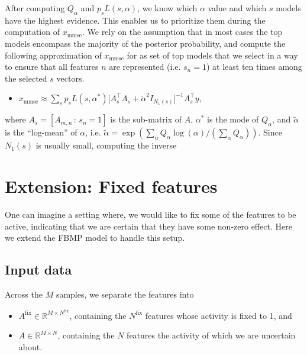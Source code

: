 \documentclass[letter,10pt,oneside]{article}
\newcommand{\no}{\noindent}
\newcommand{\+}{^\dagger}
\newcommand{\s}{^\ast}
\newcommand{\T}{^\top}
\begin{document}
After computing $Q_\alpha$ and $p_s L(s,\alpha)$, we know which $\alpha$ value and which $s$ models have the highest evidence. This enables us to prioritize them during the computation of $x_\text{mmse}$. We rely on the assumption that in most cases the top models encompass the majority of the posterior probability, and compute the following approximation of $x_\text{mmse}$ for as set of top models that we select in a way to ensure that all features $n$ are represented (i.e. $s_n=1$) at least ten times among the selected $s$ vectors.
\begin{itemize}
  \item $x_\text{mmse} \approx \sum_s p_s L(s, \alpha\s) \big[A_s\T A_s + \tilde{\alpha}^2 I_{N_1(s)}\big]^{-1}A_s\T y$,
\end{itemize}
where $A_s = [A_{m,n}\,:\,s_n=1]$ is the sub-matrix of $A$, $\alpha\s$ is the mode of $Q_\alpha$, and $\tilde \alpha$ is the ``log-mean'' of $\alpha$, i.e. $\tilde{\alpha} = \exp(\sum_\alpha Q_\alpha \log(\alpha) / (\sum_\alpha Q_\alpha))$. Since $N_1(s)$ is usually small, computing the inverse 


\section{Extension: Fixed features}
One can imagine a setting where, we would like to fix some of the features to be active, indicating that we are certain that they have some non-zero effect. Here we extend the FBMP model to handle this setup.

\subsection{Input data}
\no Across the $M$ samples, we separate the features into
\begin{itemize}
  \item $A^\text{fix} \in \mathds{R}^{M\times N^\text{fix}}$, containing the $N^\text{fix}$ features whose activity is fixed to 1, and
  \item $A\in \mathds{R}^{M\times N}$, containing the $N$ features the activity of which we are uncertain about.
\end{itemize}
\end{document}
